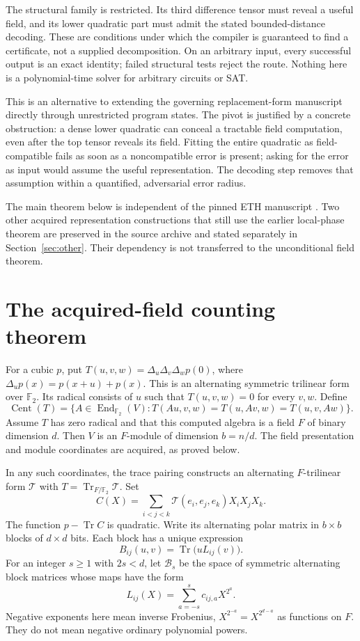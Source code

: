 \documentclass[11pt]{article}
\theoremstyle{remark}\newtheorem{remark}[theorem]{Remark}
\newcommand{\F}{\mathbb F}
\newcommand{\Tr}{\operatorname{Tr}}
\newcommand{\Cent}{\operatorname{Cent}}
\begin{document}
The structural family is restricted. Its third difference tensor must reveal a useful field, and its lower quadratic part must admit the stated bounded-distance decoding. These are conditions under which the compiler is guaranteed to find a certificate, not a supplied decomposition. On an arbitrary input, every successful output is an exact identity; failed structural tests reject the route. Nothing here is a polynomial-time solver for arbitrary circuits or SAT.

This is an alternative to extending the governing replacement-form manuscript directly through unrestricted program states. The pivot is justified by a concrete obstruction: a dense lower quadratic can conceal a tractable field computation, even after the top tensor reveals its field. Fitting the entire quadratic as field-compatible fails as soon as a noncompatible error is present; asking for the error as input would assume the useful representation. The decoding step removes that assumption within a quantified, adversarial error radius.

The main theorem below is independent of the pinned ETH manuscript \cite{eth}. Two other acquired representation constructions that still use the earlier local-phase theorem are preserved in the source archive and stated separately in Section~\ref{sec:other}. Their dependency is not transferred to the unconditional field theorem.

\section{The acquired-field counting theorem}
For a cubic $p$, put $T(u,v,w)=\Delta_u\Delta_v\Delta_w p(0)$, where $\Delta_u p(x)=p(x+u)+p(x)$. This is an alternating symmetric trilinear form over $\F_2$. Its radical consists of $u$ such that $T(u,v,w)=0$ for every $v,w$. Define
\[
 \Cent(T)=\{A\in\operatorname{End}_{\F_2}(V):
 T(Au,v,w)=T(u,Av,w)=T(u,v,Aw)\}.
\]
Assume $T$ has zero radical and that this computed algebra is a field $F$ of binary dimension $d$. Then $V$ is an $F$-module of dimension $b=n/d$. The field presentation and module coordinates are acquired, as proved below.

In any such coordinates, the trace pairing constructs an alternating $F$-trilinear form $\mathcal T$ with $T=\Tr_{F/\F_2}\mathcal T$. Set
\[
 C(X)=\sum_{i<j<k}\mathcal T(e_i,e_j,e_k)X_iX_jX_k.
\]
The function $p-\Tr C$ is quadratic. Write its alternating polar matrix in $b\times b$ blocks of $d\times d$ bits. Each block has a unique expression
\[
 B_{ij}(u,v)=\Tr\bigl(uL_{ij}(v)\bigr).
\]
For an integer $s\ge1$ with $2s<d$, let $\mathcal B_s$ be the space of symmetric alternating block matrices whose maps have the form
\begin{equation}\label{eq:band}
 L_{ij}(X)=\sum_{a=-s}^{s}c_{ij,a}X^{2^a}.
\end{equation}
Negative exponents here mean inverse Frobenius, $X^{2^{-a}}=X^{2^{d-a}}$ as functions on $F$. They do not mean negative ordinary polynomial powers.
\end{document}
